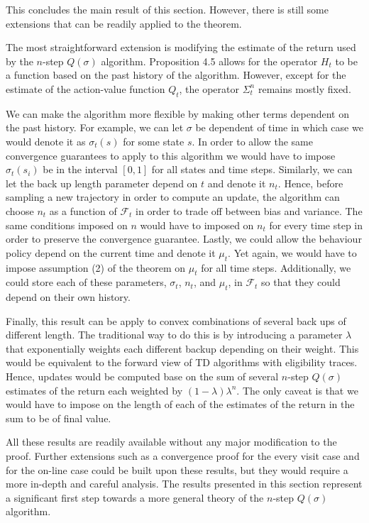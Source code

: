 This concludes the main result of this section.
However, there is still some extensions that can be readily applied to the theorem.

The most straightforward extension is modifying the estimate of the return used by the $n$-step $Q(\sigma)$ algorithm. 
Proposition 4.5 allows for the operator $H_t$ to be a function based on the past history of the algorithm.
However, except for the estimate of the action-value function $Q_t$, the operator $\Sigma^n_t$ remains mostly fixed.

We can make the algorithm more flexible by making other terms dependent on the past history.
For example, we can let $\sigma$ be dependent of time in which case we would denote it as $\sigma_t(s)$ for some state $s$.
In order to allow the same convergence guarantees to apply to this algorithm we would have to impose $\sigma_t(s_i)$ be in the interval $[0,1]$ for all states and time steps.
Similarly, we can let the back up length parameter depend on $t$ and denote it $n_t$.
Hence, before sampling a new trajectory in order to compute an update, the algorithm can choose $n_t$ as a function of $\mathcal{F}_t$ in order to trade off between bias and variance.
The same conditions imposed on $n$ would have to imposed on $n_t$ for every time step in order to preserve the convergence guarantee.
Lastly, we could allow the behaviour policy depend on the current time and denote it $\mu_t$.
Yet again, we would have to impose assumption (2) of the theorem on $\mu_t$ for all time steps.
Additionally, we could store each of these parameters, $\sigma_t$, $n_t$, and $\mu_t$, in $\mathcal{F}_t$  so that they could depend on their own history.

Finally, this result can be apply to convex combinations of several back ups of different length.
The traditional way to do this is by introducing a parameter $\lambda$ that exponentially weights each different backup depending on their weight.
This would be equivalent to the forward view of TD algorithms with eligibility traces.
Hence, updates would be computed base on the sum of several $n$-step $Q(\sigma)$ estimates of the return each weighted by $(1-\lambda)\lambda^n$.
The only caveat is that we would have to impose on the length of each of the estimates of the return in the sum to be of final value.

All these results are readily available without any major modification to the proof.
Further extensions such as a convergence proof for the every visit case and for the on-line case could be built upon these results, but they would require a more in-depth and careful analysis.
The results presented in this section represent a significant first step towards a more general theory of the $n$-step $Q(\sigma)$ algorithm.

